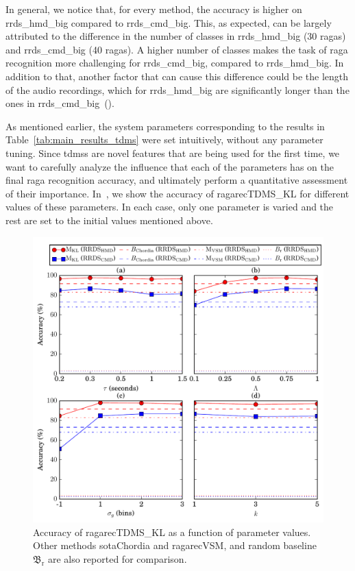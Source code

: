 In general, we notice that, for every method, the accuracy is higher on \acrshort{rrds_hmd_big} compared to \acrshort{rrds_cmd_big}. This, as expected, can be largely attributed to the difference in the number of classes in  \acrshort{rrds_hmd_big} (30 \glspl{raga}) and  \acrshort{rrds_cmd_big} (40 \glspl{raga}). A higher number of classes makes the task of \gls{raga} recognition more challenging for  \acrshort{rrds_cmd_big}, compared to  \acrshort{rrds_hmd_big}. In addition to that, another factor that can cause this difference could be the length of the audio recordings, which for  \acrshort{rrds_hmd_big} are significantly longer than the ones in \acrshort{rrds_cmd_big}~().

As mentioned earlier, the system parameters corresponding to the results in Table~\ref{tab:main_results_tdms} were set intuitively, without any parameter tuning. Since \glspl{tdms} are novel features that are being used for the first time, we want to carefully analyze the influence that each of the parameters has on the final \gls{raga} recognition accuracy, and ultimately perform a quantitative assessment of their importance. In~, we show the accuracy of \acrshort{ragarecTDMS_KL} for different values of these parameters. In each case, only one parameter is varied and the rest are set to the initial values mentioned above. 

\begin{figure}[h]
	\begin{center}
		\includegraphics[width=\figSizeHundred]{ch07_ragaRecognition/figures/AccuracyVsParameters_tdms.pdf}
	\end{center}
	\caption{Accuracy of \acrshort{ragarecTDMS_KL} as a function of parameter values. Other methods \acrshort{sotaChordia} and \acrshort{ragarecVSM}, and random baseline $\mathfrak{B}_\mathrm{r}$ are also reported for comparison.} 
	\label{fig:accuracy_vs_parameter_values_tdms}
\end{figure}

